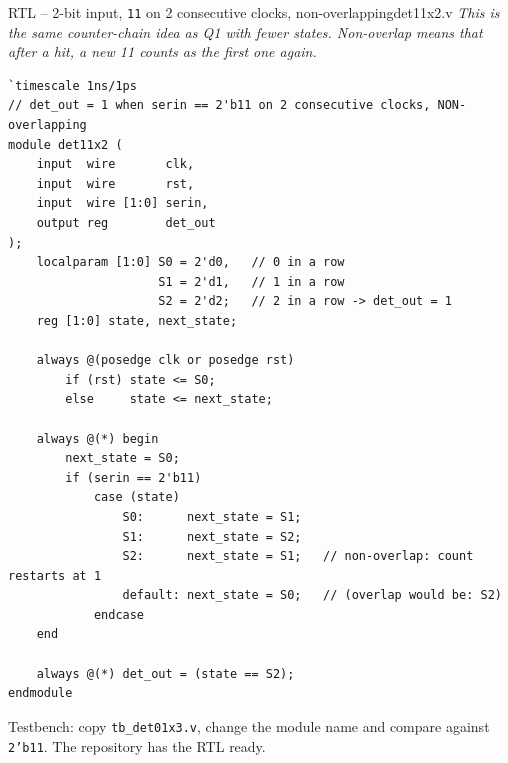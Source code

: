 \documentclass[10pt,a4paper]{article}
\newcommand{\slicenote}[1]{{\small\color{black!70}\itshape #1}\par\smallskip}
\begin{document}
\begin{center}
\begin{tikzpicture}[x=0.62cm,y=1cm,font=\scriptsize]
\end{tikzpicture}\end{center}\begin{codeslice}{RTL -- 2-bit input, \texttt{11} on 2 consecutive clocks, non-overlapping}{det11x2.v}
\slicenote{This is the same counter-chain idea as Q1 with fewer states. Non-overlap means that after a hit, a new 11 counts as the first one again.}
\begin{lstlisting}
`timescale 1ns/1ps
// det_out = 1 when serin == 2'b11 on 2 consecutive clocks, NON-overlapping
module det11x2 (
    input  wire       clk,
    input  wire       rst,
    input  wire [1:0] serin,
    output reg        det_out
);
    localparam [1:0] S0 = 2'd0,   // 0 in a row
                     S1 = 2'd1,   // 1 in a row
                     S2 = 2'd2;   // 2 in a row -> det_out = 1
    reg [1:0] state, next_state;

    always @(posedge clk or posedge rst)
        if (rst) state <= S0;
        else     state <= next_state;

    always @(*) begin
        next_state = S0;
        if (serin == 2'b11)
            case (state)
                S0:      next_state = S1;
                S1:      next_state = S2;
                S2:      next_state = S1;   // non-overlap: count restarts at 1
                default: next_state = S0;   // (overlap would be: S2)
            endcase
    end

    always @(*) det_out = (state == S2);
endmodule
\end{lstlisting}
\end{codeslice}
{\small Testbench: copy \texttt{tb\_det01x3.v}, change the module name and compare against
\texttt{2'b11}. The repository has the RTL ready.}
\end{document}
